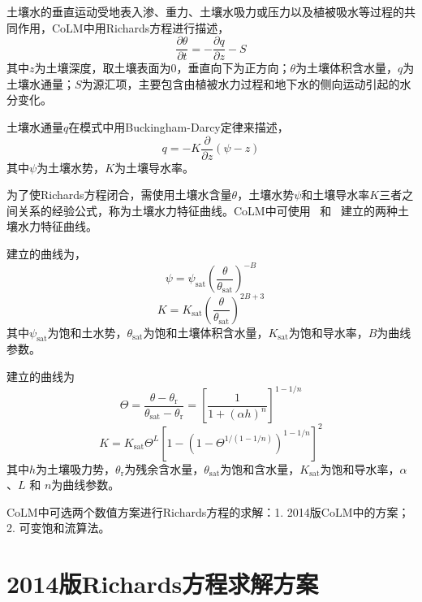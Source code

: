土壤水的垂直运动受地表入渗、重力、土壤水吸力或压力以及植被吸水等过程的共同作用，CoLM中用Richards方程进行描述，
\begin{equation}
  \frac{\partial \theta}{\partial t}=-\frac{\partial q}{\partial z}-S
\end{equation}
其中$z$为土壤深度，取土壤表面为0，垂直向下为正方向；$\theta$为土壤体积含水量，$q$为土壤水通量；$S$为源汇项，主要包含由植被水力过程和地下水的侧向运动引起的水分变化。

土壤水通量$q$在模式中用Buckingham-Darcy定律来描述，
\begin{equation}
  q=-K \frac{\partial}{\partial z}(\psi-z)
\end{equation}
其中$\psi$为土壤水势，$K$为土壤导水率。

为了使Richards方程闭合，需使用土壤水含量$\theta$，土壤水势$\psi$和土壤导水率$K$三者之间关系的经验公式，称为土壤水力特征曲线。CoLM中可使用~\citet{campbell1974} 和~\citet{van1980closed} 建立的两种土壤水力特征曲线。

\citet{campbell1974}建立的曲线为，
\begin{equation}\label{eq:SW_CB}
  \psi=\psi_{\mathrm{sat}}\left(\frac{\theta}{\theta_{\mathrm{sat}}}\right)^{-B}
\end{equation}
\begin{equation}\label{eq:Ks_CB}
  K=K_{\mathrm{sat}}\left(\frac{\theta}{\theta_{\mathrm{sat}}}\right)^{2 B+3}
\end{equation}
其中$\psi_{\mathrm {sat}} $为饱和土水势，$\theta_{\mathrm{sat}}$为饱和土壤体积含水量，$K_{\mathrm{sat}}$为饱和导水率，$B$为曲线参数。

\citet{van1980closed} 建立的曲线为
\begin{equation}\label{eq:SW_VG}
  \Theta = \frac{\theta-\theta_{\mathrm {r}} }{\theta_{\mathrm {sat}} -\theta_{\mathrm {r}} } = \left[\frac{1}{1+\left(\alpha h\right)^n}\right]^{1-1/n}
\end{equation}
\begin{equation}\label{eq:Ks_VG}
  K = K_{\mathrm {sat}}  \Theta^L \left[1-\left(1-\Theta^{1/\left(1-1/n\right)}\right)^{1-1/n}\right]^2
\end{equation}
其中$h$为土壤吸力势，$\theta_{\mathrm {r}} $为残余含水量，$\theta_{\mathrm {sat}} $为饱和含水量，$K_{\mathrm{sat}}$为饱和导水率，$\alpha$、$L$ 和 $n$为曲线参数。

CoLM中可选两个数值方案进行Richards方程的求解：1. 2014版CoLM中的方案；2. 可变饱和流算法。

\section{2014版Richards方程求解方案}

